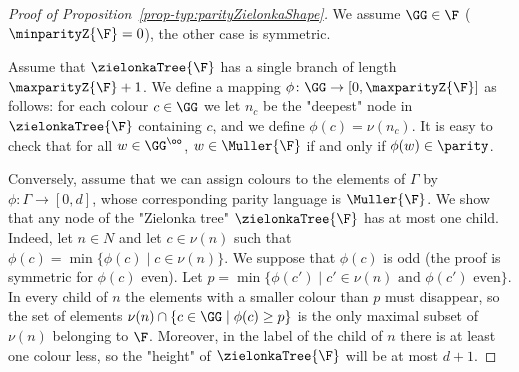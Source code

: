 \documentclass[10pt,a4paper]{amsart}
\newcommand{\tand}{\text{ and }}
\begin{document}
	
\begin{proof}[Proof of Proposition~\ref{prop-typ:parityZielonkaShape}]
	We assume $\GG\in \F$ ($\minparityZ{\F}=0$), the other case is symmetric.
			
	Assume that $\zielonkaTree{\F}$ has a single branch of length $\maxparityZ{\F}+1$. We define a mapping $\phi\colon \GG \to [0, \maxparityZ{\F}]$ as  follows: for each colour $c\in \GG$ we let $n_c$ be the "deepest" node in $\zielonkaTree{\F}$ containing $c$, and we define $\phi(c) = \nu(n_c)$. It is easy to check that for all $w\in\GG^\oo$, $w\in \Muller{\F}$ if and only if $\phi(w)\in \parity$.
	
			
	Conversely, assume that we can assign colours to the elements of $\Gamma$ by $\phi:\Gamma \rightarrow [0, d]$, whose corresponding parity language is $\Muller{\F}$. We show that any node of the "Zielonka tree" $\zielonkaTree{\F}$ has at most one child. Indeed, let $n \in N$ and let $c\in \nu(n)$ such that $\phi(c) = \min\{\phi(c) \mid c\in \nu(n)\}$. We suppose that $\phi(c)$ is odd (the proof is symmetric for $\phi(c)$ even). Let $p = \min\{\phi(c') \mid c'\in \nu(n) \tand \phi(c') \text{ even}\}$. In every child of $n$ the elements with a smaller colour than $p$ must disappear, so the set of elements $\nu(n)\cap \{c\in \GG \mid \phi(c) \geq p \}$ is the only maximal subset of $\nu(n)$ belonging to $\F$. Moreover, in the label of the child of $n$ there is at least one colour less, so the "height" of $\zielonkaTree{\F}$ will be at most $d+1$.
\end{proof}

 	
\end{document}
